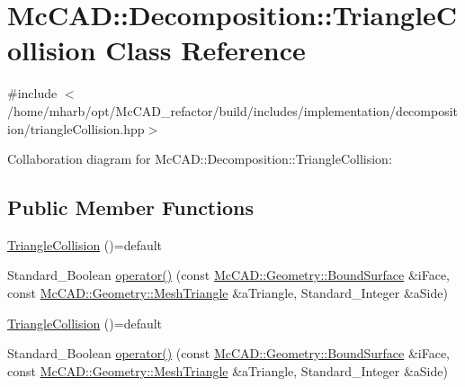 \hypertarget{classMcCAD_1_1Decomposition_1_1TriangleCollision}{}\section{Mc\+C\+AD\+:\+:Decomposition\+:\+:Triangle\+Collision Class Reference}
\label{classMcCAD_1_1Decomposition_1_1TriangleCollision}


{\ttfamily \#include $<$/home/mharb/opt/\+Mc\+C\+A\+D\+\_\+refactor/build/includes/implementation/decomposition/triangle\+Collision.\+hpp$>$}



Collaboration diagram for Mc\+C\+AD\+:\+:Decomposition\+:\+:Triangle\+Collision\+:
\subsection*{Public Member Functions}
\begin{DoxyCompactItemize}
\item 
\hyperlink{classMcCAD_1_1Decomposition_1_1TriangleCollision_adbe18fc0df5b332d9edfc1d189d5d4c7}{Triangle\+Collision} ()=default
\item 
Standard\+\_\+\+Boolean \hyperlink{classMcCAD_1_1Decomposition_1_1TriangleCollision_af452f50ec7e08c8bc01d7f81f543ce9f}{operator()} (const \hyperlink{classMcCAD_1_1Geometry_1_1BoundSurface}{Mc\+C\+A\+D\+::\+Geometry\+::\+Bound\+Surface} \&i\+Face, const \hyperlink{classMcCAD_1_1Geometry_1_1MeshTriangle}{Mc\+C\+A\+D\+::\+Geometry\+::\+Mesh\+Triangle} \&a\+Triangle, Standard\+\_\+\+Integer \&a\+Side)
\item 
\hyperlink{classMcCAD_1_1Decomposition_1_1TriangleCollision_adbe18fc0df5b332d9edfc1d189d5d4c7}{Triangle\+Collision} ()=default
\item 
Standard\+\_\+\+Boolean \hyperlink{classMcCAD_1_1Decomposition_1_1TriangleCollision_af452f50ec7e08c8bc01d7f81f543ce9f}{operator()} (const \hyperlink{classMcCAD_1_1Geometry_1_1BoundSurface}{Mc\+C\+A\+D\+::\+Geometry\+::\+Bound\+Surface} \&i\+Face, const \hyperlink{classMcCAD_1_1Geometry_1_1MeshTriangle}{Mc\+C\+A\+D\+::\+Geometry\+::\+Mesh\+Triangle} \&a\+Triangle, Standard\+\_\+\+Integer \&a\+Side)
\end{DoxyCompactItemize}
